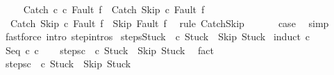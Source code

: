 \begin{isabellebody}
\ \ \isamarkupfalse%
\ {\isachardoublequoteopen}{\isasymGamma}{\isasymturnstile}\ {\isacharparenleft}Catch\ c\ c\ Fault\ f{\isacharparenright}\ {\isasymrightarrow}\isactrlsup {\isacharasterisk}\ {\isacharparenleft}Catch\ Skip\ c\ Fault\ f{\isacharparenright}{\isachardoublequoteclose}\isacommand{{\isachardot}}\isamarkupfalse%
\isanewline
\ \ \isamarkupfalse%
\isanewline
\ \ \isamarkupfalse%
\ {\isachardoublequoteopen}{\isasymGamma}{\isasymturnstile}\ {\isacharparenleft}Catch\ Skip\ c\ Fault\ f{\isacharparenright}\ {\isasymrightarrow}\ {\isacharparenleft}Skip{\isacharcomma}\ Fault\ f{\isacharparenright}{\isachardoublequoteclose}\ \isamarkupfalse%
\ {\isacharparenleft}rule\ CatchSkip{\isacharparenright}\ \isanewline
\ \ \isamarkupfalse%
\ \isamarkupfalse%
\ {\isacharquery}case\ \isamarkupfalse%
\ simp\isanewline
{}\isamarkupfalse%
\ {\isacharparenleft}fastforce\ intro{\isacharcolon}\ step{\isachardot}intros{\isacharparenright}{\isacharplus}%
\endisatagproof
{\isafoldproof}%
%
\isadelimproof
\isanewline
%
\endisadelimproof
\isanewline
{}\isamarkupfalse%
\ steps{\isacharunderscore}Stuck{\isacharcolon}\ {\isachardoublequoteopen}{\isasymGamma}{\isasymturnstile}\ {\isacharparenleft}c{\isacharcomma}\ Stuck{\isacharparenright}\ {\isasymrightarrow}\isactrlsup {\isacharasterisk}\ {\isacharparenleft}Skip{\isacharcomma}\ Stuck{\isacharparenright}{\isachardoublequoteclose}\isanewline
%
\isadelimproof
%
\endisadelimproof
%
\isatagproof
{}\isamarkupfalse%
\ {\isacharparenleft}induct\ c{\isacharparenright}\isanewline
\ \ \isamarkupfalse%
\ {\isacharparenleft}Seq\ c\ c\isanewline
\ \ \isamarkupfalse%
\ steps{\isacharunderscore}c\ {\isachardoublequoteopen}{\isasymGamma}{\isasymturnstile}\ {\isacharparenleft}c\ Stuck{\isacharparenright}\ {\isasymrightarrow}\isactrlsup {\isacharasterisk}\ {\isacharparenleft}Skip{\isacharcomma}\ Stuck{\isacharparenright}{\isachardoublequoteclose}\ \isamarkupfalse%
\ fact\isanewline
\ \ \isamarkupfalse%
\ steps{\isacharunderscore}c\ {\isachardoublequoteopen}{\isasymGamma}{\isasymturnstile}\ {\isacharparenleft}c\ Stuck{\isacharparenright}\ {\isasymrightarrow}\isactrlsup {\isacharasterisk}\ {\isacharparenleft}Skip{\isacharcomma}\ Stuck{\isacharparenright}{\isachardoublequoteclose}\ \isamarkupfalse%

\end{isabellebody}
